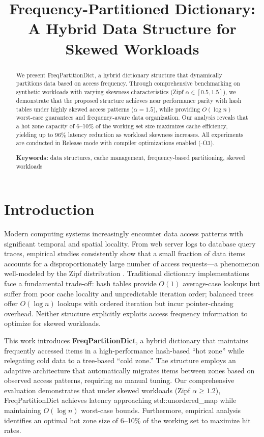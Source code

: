 \documentclass[11pt,a4paper]{article}
\title{\textbf{Frequency-Partitioned Dictionary: A Hybrid Data Structure for Skewed Workloads}}
\author{}
\date{}
\begin{document}
\maketitle

\begin{abstract}
We present FreqPartitionDict, a hybrid dictionary structure that dynamically partitions data based on access frequency. Through comprehensive benchmarking on synthetic workloads with varying skewness characteristics (Zipf $\alpha \in [0.5, 1.5]$), we demonstrate that the proposed structure achieves near performance parity with hash tables under highly skewed access patterns ($\alpha = 1.5$), while providing $O(\log n)$ worst-case guarantees and frequency-aware data organization. Our analysis reveals that a hot zone capacity of 6--10\% of the working set size maximizes cache efficiency, yielding up to 96\% latency reduction as workload skewness increases. All experiments are conducted in Release mode with compiler optimizations enabled (-O3).

\noindent\textbf{Keywords:} data structures, cache management, frequency-based partitioning, skewed workloads
\end{abstract}

\section{Introduction}

Modern computing systems increasingly encounter data access patterns with significant temporal and spatial locality. From web server logs to database query traces, empirical studies consistently show that a small fraction of data items accounts for a disproportionately large number of access requests---a phenomenon well-modeled by the Zipf distribution \cite{zipf1949}. Traditional dictionary implementations face a fundamental trade-off: hash tables provide $O(1)$ average-case lookups but suffer from poor cache locality and unpredictable iteration order; balanced trees offer $O(\log n)$ lookups with ordered iteration but incur pointer-chasing overhead. Neither structure explicitly exploits access frequency information to optimize for skewed workloads.

This work introduces \textbf{FreqPartitionDict}, a hybrid dictionary that maintains frequently accessed items in a high-performance hash-based ``hot zone'' while relegating cold data to a tree-based ``cold zone.'' The structure employs an adaptive architecture that automatically migrates items between zones based on observed access patterns, requiring no manual tuning. Our comprehensive evaluation demonstrates that under skewed workloads (Zipf $\alpha \geq 1.2$), FreqPartitionDict achieves latency approaching std::unordered\_map while maintaining $O(\log n)$ worst-case bounds. Furthermore, empirical analysis identifies an optimal hot zone size of 6--10\% of the working set to maximize hit rates.
\end{document}
